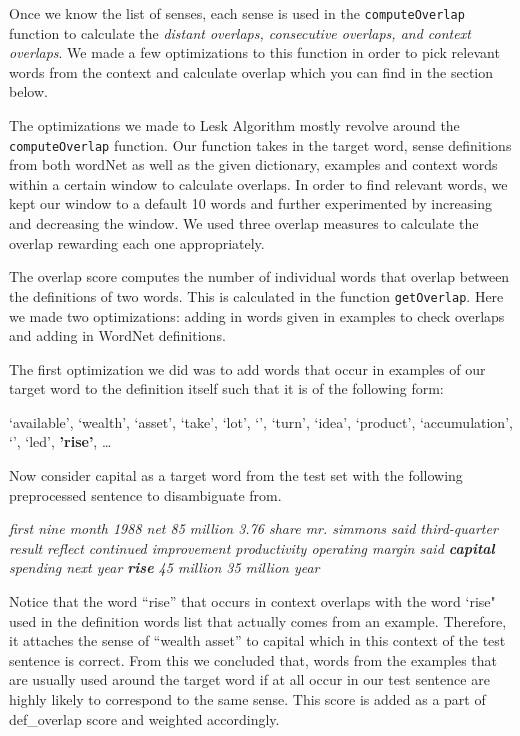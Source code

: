\documentclass{article}
\begin{document}
Once we know the list of senses, each sense is used in the \texttt{computeOverlap} function to calculate the \emph{distant overlaps, consecutive overlaps, and context overlaps}. We made a few optimizations to this function in order to pick relevant words from the context and calculate overlap which you can find in the section below.

The optimizations we made to Lesk Algorithm mostly revolve around the \texttt{computeOverlap} function. Our function takes in the target word, sense definitions from both wordNet as well as the given dictionary, examples and context words within a certain window to calculate overlaps. In order to find relevant words, we kept our window to a default 10 words and further experimented by increasing and decreasing the window. We used three overlap measures to calculate the overlap rewarding each one appropriately.\bigskip

The overlap score computes the number of individual words that overlap between the definitions of two words. This is calculated in the function \texttt{getOverlap}. Here we made two optimizations: adding in words given in examples to check overlaps and adding in WordNet definitions.

The first optimization we did was to add words that occur in examples of our target word to the definition itself such that it is of the following form: 

\lbrack `available', `wealth', `asset', `take', `lot', `', `turn', `idea', `product', `accumulation', `', `led', \textbf{'rise'}, \ldots \rbrack

Now consider capital as a target word from the test set with the following preprocessed sentence to disambiguate from. \par

\textit{first nine month 1988 net 85 million 3.76 share mr. simmons said third-quarter result reflect continued improvement productivity operating margin said \textbf{capital} spending next year \textbf{rise} 45 million 35 million year}
\par
Notice that the word ``rise'' that occurs in context overlaps with the word `rise" used in the definition words list that actually comes from an example. Therefore, it attaches the sense of ``wealth asset'' to capital which in this context of the test sentence is correct. From this we concluded that, words from the examples that are usually used around the target word if at all occur in our test sentence are highly likely to correspond to the same sense. This score is added as a part of def\_overlap score and weighted accordingly.
\end{document}

